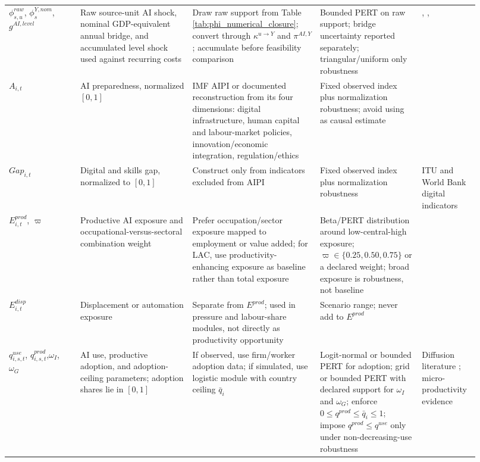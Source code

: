 \documentclass[11pt,a4paper]{article}
\begin{document}
\begin{landscape}
\begin{longtable}{@{}p{0.14\linewidth}p{0.22\linewidth}p{0.25\linewidth}p{0.20\linewidth}p{0.11\linewidth}@{}}
$\phi^{raw}_{s,u}$, $\phi^{Y,nom}_s$, $g^{AI,level}$ & Raw source-unit AI shock, nominal GDP-equivalent annual bridge, and accumulated level shock used against recurring costs & Draw raw support from Table \ref{tab:phi_numerical_closure}; convert through $\kappa^{u\to Y}$ and $\pi^{AI,Y}$; accumulate before feasibility comparison & Bounded PERT on raw support; bridge uncertainty reported separately; triangular/uniform only robustness & \citet{acemoglu2024simple}, \citet{filippucci2024miracle}, \citet{oecd2025g7} \\
$A_{i,t}$ & AI preparedness, normalized $[0,1]$ & IMF AIPI or documented reconstruction from its four dimensions: digital infrastructure, human capital and labour-market policies, innovation/economic integration, regulation/ethics & Fixed observed index plus normalization robustness; avoid using as causal estimate & \citet{imf2024aipi,cazzaniga2024genai} \\
$Gap_{i,t}$ & Digital and skills gap, normalized to $[0,1]$ & Construct only from indicators excluded from AIPI & Fixed observed index plus normalization robustness & ITU and World Bank digital indicators \\
$E^{prod}_{i,t}$, $\varpi$ & Productive AI exposure and occupational-versus-sectoral combination weight & Prefer occupation/sector exposure mapped to employment or value added; for LAC, use productivity-enhancing exposure as baseline rather than total exposure & Beta/PERT distribution around low-central-high exposure; $\varpi\in\{0.25,0.50,0.75\}$ or a declared weight; broad exposure is robustness, not baseline & \citet{worldbankilo2024lacgenai,cazzaniga2024genai} \\
$E^{disp}_{i,t}$ & Displacement or automation exposure & Separate from $E^{prod}$; used in pressure and labour-share modules, not directly as productivity opportunity & Scenario range; never add to $E^{prod}$ & \citet{worldbankilo2024lacgenai,cazzaniga2024genai} \\
$q^{use}_{i,s,t}$, $q^{prod}_{i,s,t}$,\newline $\omega_I$, $\omega_G$ & AI use, productive adoption, and adoption-ceiling parameters; adoption shares lie in $[0,1]$ & If observed, use firm/worker adoption data; if simulated, use logistic module with country ceiling $\bar q_i$ & Logit-normal or bounded PERT for adoption; grid or bounded PERT with declared support for $\omega_I$ and $\omega_G$; enforce $0\le q^{prod}\le\bar q_i\le1$; impose $q^{prod}\le q^{use}$ only under non-decreasing-use robustness & Diffusion literature \citep{bass1969newproduct,rogers2003diffusion}; micro-productivity evidence \citep{noy2023experimental,brynjolfsson2023generative} \\

\end{longtable}
\end{landscape}
\end{document}
